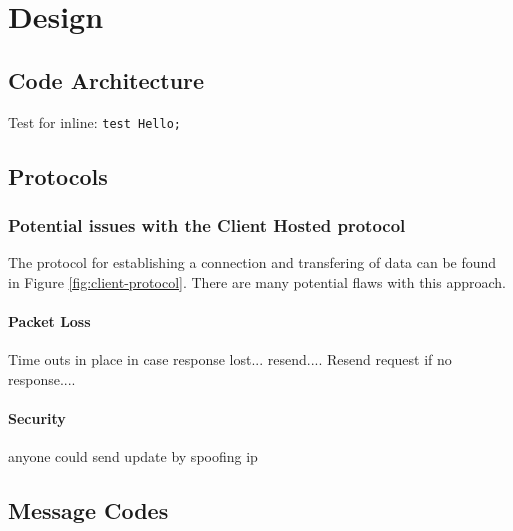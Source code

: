 \chapter{Design}

\section{Code Architecture}

Test for inline: \lstinline{test Hello;}

\section{Protocols}


\subsection{Potential issues with the Client Hosted protocol}
The protocol for establishing a connection and transfering of data can be found in Figure \ref{fig:client-protocol}. There are many potential flaws with this approach.
\subsubsection{Packet Loss}
Time outs in place in case response lost...
resend....
Resend request if no response....


\subsubsection{Security}
anyone could send update by spoofing ip


\pagebreak
\section{Message Codes}



\pagebreak
